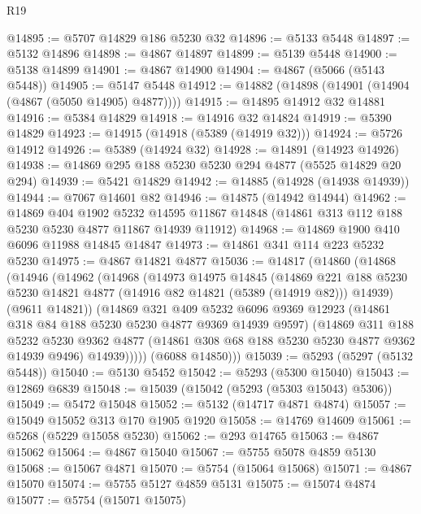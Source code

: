 \begin{lexlean}{R19}
\begin{coremodule}
@14895 := @5707 @14829 @186 @5230 @32
@14896 := @5133 @5448
@14897 := @5132 @14896
@14898 := @4867 @14897
@14899 := @5139 @5448
@14900 := @5138 @14899
@14901 := @4867 @14900
@14904 := @4867 (@5066 (@5143 @5448))
@14905 := @5147 @5448
@14912 := @14882 (@14898 (@14901 (@14904 (@4867 (@5050 @14905) @4877))))
@14915 := @14895 @14912 @32 @14881
@14916 := @5384 @14829
@14918 := @14916 @32 @14824
@14919 := @5390 @14829
@14923 := @14915 (@14918 (@5389 (@14919 @32)))
@14924 := @5726 @14912
@14926 := @5389 (@14924 @32)
@14928 := @14891 (@14923 @14926)
@14938 := @14869 @295 @188 @5230 @5230 @294 @4877 (@5525 @14829 @20 @294)
@14939 := @5421 @14829
@14942 := @14885 (@14928 (@14938 @14939))
@14944 := @7067 @14601 @82
@14946 := @14875 (@14942 @14944)
@14962 := @14869
    @404
    @1902
    @5232
    @14595
    @11867
    @14848
    (@14861 @313 @112 @188 @5230 @5230 @4877 @11867 @14939 @11912)
@14968 := @14869 @1900 @410 @6096 @11988 @14845 @14847
@14973 := @14861 @341 @114 @223 @5232 @5230
@14975 := @4867 @14821 @4877
@15036 := @14817
    (@14860
      (@14868
        (@14946
          (@14962
            (@14968
              (@14973
                @14975
                @14845
                (@14869
                  @221
                  @188
                  @5230
                  @5230
                  @14821
                  @4877
                  (@14916 @82 @14821 (@5389 (@14919 @82)))
                  @14939)
                (@9611 @14821))
              (@14869
                @321
                @409
                @5232
                @6096
                @9369
                @12923
                (@14861 @318 @84 @188 @5230 @5230 @4877 @9369 @14939 @9597)
                (@14869
                  @311
                  @188
                  @5232
                  @5230
                  @9362
                  @4877
                  (@14861 @308 @68 @188 @5230 @5230 @4877 @9362 @14939 @9496)
                  @14939)))))
        (@6088 @14850)))
@15039 := @5293 (@5297 (@5132 @5448))
@15040 := @5130 @5452
@15042 := @5293 (@5300 @15040)
@15043 := @12869 @6839
@15048 := @15039 (@15042 (@5293 (@5303 @15043) @5306))
@15049 := @5472 @15048
@15052 := @5132 (@14717 @4871 @4874)
@15057 := @15049 @15052 @313 @170 @1905 @1920
@15058 := @14769 @14609
@15061 := @5268 (@5229 @15058 @5230)
@15062 := @293 @14765
@15063 := @4867 @15062
@15064 := @4867 @15040
@15067 := @5755 @5078 @4859 @5130
@15068 := @15067 @4871
@15070 := @5754 (@15064 @15068)
@15071 := @4867 @15070
@15074 := @5755 @5127 @4859 @5131
@15075 := @15074 @4874
@15077 := @5754 (@15071 @15075)

\end{coremodule}
\end{lexlean}
